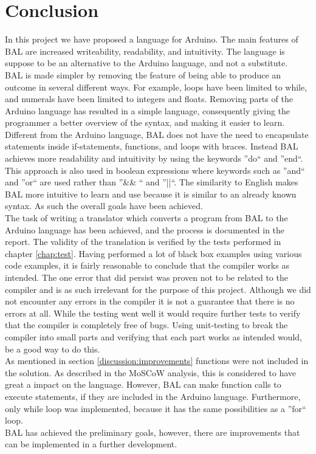 \section{Conclusion}

In this project we have proposed a language for Arduino. The main features of BAL are increased writeability, readability, and intuitivity. The language is suppose to be an alternative to the Arduino language, and not a substitute.\\

BAL is made simpler by removing the feature of being able to produce an outcome in several different ways. For example, loops have been limited to while, and numerals have been limited to integers and floats. Removing parts of the Arduino language has resulted in a simple language, consequently giving the programmer a better overview of the syntax, and making it easier to learn. Different from the Arduino language, BAL does not have the need to encapsulate statements inside if-statements, functions, and loops with braces. Instead BAL achieves more readability and intuitivity by using the keywords ''do`` and ''end``. This approach is also used in boolean expressions where keywords such as ''and`` and ''or`` are used rather than ''\&\& `` and ''||``. The similarity to English makes BAL more intuitive to learn and use because it is similar to an already known syntax. As such the overall goals have been achieved. \\
The task of writing a translator which converts a program from BAL to the Arduino language has been achieved, and the process is documented in the report. The validity of the translation is verified by the tests performed in
chapter \ref{chap:test}. Having performed a lot of black box examples using various code examples, it is fairly reasonable to conclude that the compiler works as intended. The one error that did persist was proven not to be related to the compiler and is as such irrelevant for the purpose of this project. Although we did not encounter any errors in the compiler it is not a guarantee that there is no errors at all. While the testing went well it would require further tests to verify that the compiler is completely free of bugs. Using unit-testing to break the compiler into small parts and verifying that each part works as intended would, be a good way to do this. \\
As mentioned in section \ref{discussion:improvements} functions were not included in the solution. As described in the MoSCoW analysis, this is considered to have great a impact on the language. However, BAL can make function calls to execute statements, if they are included in the Arduino language. Furthermore, only while loop was implemented, because it has the same possibilities as a ''for`` loop. \\

BAL has achieved the preliminary goals, however, there are improvements that can be implemented in a further development.\\